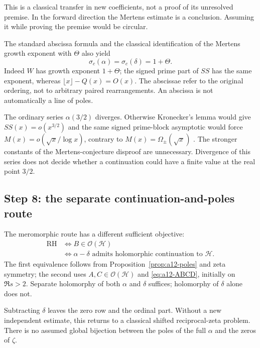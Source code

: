 This is a classical transfer in new coefficients, not a proof of its
unresolved premise. In the forward direction the Mertens estimate is
a conclusion. Assuming it while proving the premise would be circular.

The standard abscissa formula and the classical identification of the
Mertens growth exponent with $\Theta$ also yield
\begin{equation}
\label{eq:a12-abscissae}
\sigma_c(\alpha)=\sigma_c(\delta)=1+\Theta.
\end{equation}
Indeed $W$ has growth exponent $1+\Theta$; the signed prime part of $SS$
has the same exponent, whereas $\lfloor x\rfloor-Q(x)=O(x)$.
The abscissae refer to the original ordering, not to arbitrary paired
rearrangements. An abscissa is not automatically a line of poles.

The ordinary series $\alpha(3/2)$ diverges. Otherwise Kronecker's lemma
would give $SS(x)=o(x^{3/2})$ and the same signed prime-block asymptotic
would force $M(x)=o(\sqrt x/\log x)$, contrary to
$M(x)=\Omega_\pm(\sqrt x)$ \cite{Ng2004,OdlyzkoTeRiele1985}.
The stronger constants of the Mertens-conjecture disproof are unnecessary.
Divergence of this series does not decide whether a continuation could
have a finite value at the real point $3/2$.
\subsection{Step 8: the separate continuation-and-poles route}
\label{subsec:a12-continuation}
The meromorphic route has a different sufficient objective:
\begin{equation}
\label{eq:a12-analytic-criterion}
\boxed{
\begin{aligned}
\mathrm{RH}&\Longleftrightarrow B\in\mathcal O(\mathcal H)\\
&\Longleftrightarrow
\alpha-\delta\text{ admits holomorphic continuation to }\mathcal H.
\end{aligned}}
\end{equation}
The first equivalence follows from Proposition~\ref{prop:a12-poles} and
zeta symmetry; the second uses $A,C\in\mathcal O(\mathcal H)$ and
\eqref{eq:a12-ABCD}, initially on $\Re s>2$.
Separate holomorphy of both $\alpha$ and $\delta$ suffices; holomorphy of
$\delta$ alone does not.

Subtracting $\delta$ leaves the zero row and the ordinal part.
Without a new independent estimate, this returns to a classical shifted
reciprocal-zeta problem. There is no assumed global bijection between
the poles of the full $\alpha$ and the zeros of $\zeta$.

